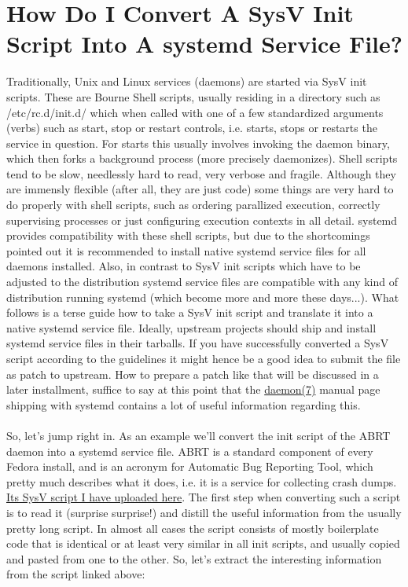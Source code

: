 \documentclass[titlepage]{article}
\begin{document}
\section{How Do I Convert A SysV Init Script Into A systemd Service File?}
Traditionally, Unix and Linux services (daemons) are started via SysV init scripts. These are Bourne Shell scripts, usually residing in a directory such as /etc/rc.d/init.d/ which when called with one of a few standardized arguments (verbs) such as start, stop or restart controls, i.e. starts, stops or restarts the service in question. For starts this usually involves invoking the daemon binary, which then forks a background process (more precisely daemonizes). Shell scripts tend to be slow, needlessly hard to read, very verbose and fragile. Although they are immensly flexible (after all, they are just code) some things are very hard to do properly with shell scripts, such as ordering parallized execution, correctly supervising processes or just configuring execution contexts in all detail. systemd provides compatibility with these shell scripts, but due to the shortcomings pointed out it is recommended to install native systemd service files for all daemons installed. Also, in contrast to SysV init scripts which have to be adjusted to the distribution systemd service files are compatible with any kind of distribution running systemd (which become more and more these days...). What follows is a terse guide how to take a SysV init script and translate it into a native systemd service file. Ideally, upstream projects should ship and install systemd service files in their tarballs. If you have successfully converted a SysV script according to the guidelines it might hence be a good idea to submit the file as patch to upstream. How to prepare a patch like that will be discussed in a later installment, suffice to say at this point that the \href{https://0pointer.de/public/systemd-man/daemon.html}{daemon(7)} manual page shipping with systemd contains a lot of useful information regarding this.
\\
\\
So, let's jump right in. As an example we'll convert the init script of the ABRT daemon into a systemd service file. ABRT is a standard component of every Fedora install, and is an acronym for Automatic Bug Reporting Tool, which pretty much describes what it does, i.e. it is a service for collecting crash dumps. \href{https://0pointer.de/public/abrtd}{Its SysV script I have uploaded here}.
\newpage
The first step when converting such a script is to read it (surprise surprise!) and distill the useful information from the usually pretty long script. In almost all cases the script consists of mostly boilerplate code that is identical or at least very similar in all init scripts, and usually copied and pasted from one to the other. So, let's extract the interesting information from the script linked above:
\end{document}
